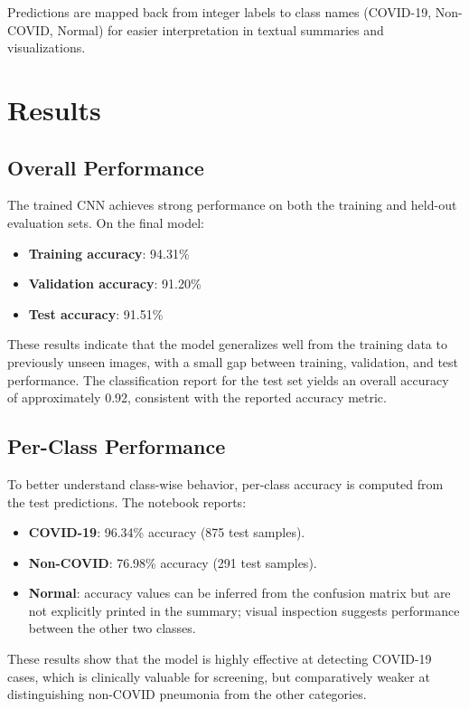 \documentclass[conference]{IEEEtran}
\begin{document}
Predictions are mapped back from integer labels to class names (COVID-19, Non-COVID, Normal) for easier interpretation in textual summaries and visualizations.

\section{Results}

\subsection{Overall Performance}

The trained CNN achieves strong performance on both the training and held-out evaluation sets. On the final model:
\begin{itemize}
    \item \textbf{Training accuracy}: 94.31\%
    \item \textbf{Validation accuracy}: 91.20\%
    \item \textbf{Test accuracy}: 91.51\%
\end{itemize}

These results indicate that the model generalizes well from the training data to previously unseen images, with a small gap between training, validation, and test performance. The classification report for the test set yields an overall accuracy of approximately 0.92, consistent with the reported accuracy metric.

\subsection{Per-Class Performance}

To better understand class-wise behavior, per-class accuracy is computed from the test predictions. The notebook reports:
\begin{itemize}
    \item \textbf{COVID-19}: 96.34\% accuracy (875 test samples).
    \item \textbf{Non-COVID}: 76.98\% accuracy (291 test samples).
    \item \textbf{Normal}: accuracy values can be inferred from the confusion matrix but are not explicitly printed in the summary; visual inspection suggests performance between the other two classes.
\end{itemize}

These results show that the model is highly effective at detecting COVID-19 cases, which is clinically valuable for screening, but comparatively weaker at distinguishing non-COVID pneumonia from the other categories.
\end{document}

